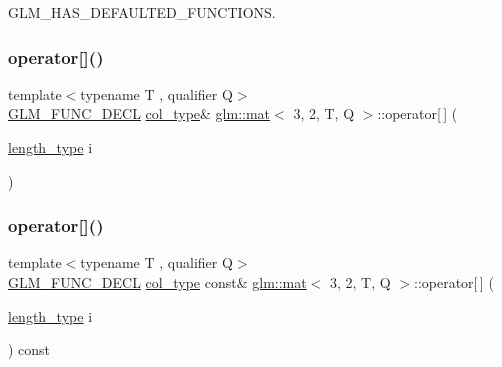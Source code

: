 G\+L\+M\+\_\+\+H\+A\+S\+\_\+\+D\+E\+F\+A\+U\+L\+T\+E\+D\+\_\+\+F\+U\+N\+C\+T\+I\+O\+NS. 

\mbox{\label{structglm_1_1mat_3_013_00_012_00_01_t_00_01_q_01_4_ab749a8bb52d92b278cdfdd6de7201b03}} 
\subsubsection{\texorpdfstring{operator[]()}{operator[]()}\hspace{0.1cm}{\footnotesize\ttfamily [1/2]}}
{\footnotesize\ttfamily template$<$typename T , qualifier Q$>$ \\
\hyperlink{setup_8hpp_ab2d052de21a70539923e9bcbf6e83a51}{G\+L\+M\+\_\+\+F\+U\+N\+C\+\_\+\+D\+E\+CL} \hyperlink{structglm_1_1mat_3_013_00_012_00_01_t_00_01_q_01_4_aa610dcaaae528e1eea8bdaaa435ad3a4}{col\+\_\+type}\& \hyperlink{structglm_1_1mat}{glm\+::mat}$<$ 3, 2, T, Q $>$\+::operator\mbox{[}$\,$\mbox{]} (\begin{DoxyParamCaption}\item[{\hyperlink{structglm_1_1mat_3_013_00_012_00_01_t_00_01_q_01_4_ac2f268fa5e899b2a6ad8139183ed61d4}{length\+\_\+type}}]{i }\end{DoxyParamCaption})}

\mbox{\label{structglm_1_1mat_3_013_00_012_00_01_t_00_01_q_01_4_a73a97c49ef108592edf14b0ac70f8264}} 
\subsubsection{\texorpdfstring{operator[]()}{operator[]()}\hspace{0.1cm}{\footnotesize\ttfamily [2/2]}}
{\footnotesize\ttfamily template$<$typename T , qualifier Q$>$ \\
\hyperlink{setup_8hpp_ab2d052de21a70539923e9bcbf6e83a51}{G\+L\+M\+\_\+\+F\+U\+N\+C\+\_\+\+D\+E\+CL} \hyperlink{structglm_1_1mat_3_013_00_012_00_01_t_00_01_q_01_4_aa610dcaaae528e1eea8bdaaa435ad3a4}{col\+\_\+type} const\& \hyperlink{structglm_1_1mat}{glm\+::mat}$<$ 3, 2, T, Q $>$\+::operator\mbox{[}$\,$\mbox{]} (\begin{DoxyParamCaption}\item[{\hyperlink{structglm_1_1mat_3_013_00_012_00_01_t_00_01_q_01_4_ac2f268fa5e899b2a6ad8139183ed61d4}{length\+\_\+type}}]{i }\end{DoxyParamCaption}) const}




